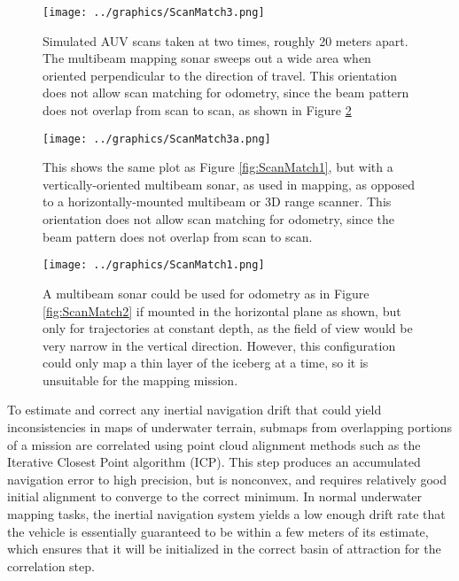 \begin{figure}[h]
   \centering
   \texttt{[image: ../graphics/ScanMatch3.png]} %
   \caption{Simulated AUV scans taken at two times, roughly 20 meters apart. The multibeam mapping sonar sweeps out a wide area when oriented perpendicular to the direction of travel. This orientation does not allow scan matching for odometry, since the beam pattern does not overlap from scan to scan, as shown in Figure \ref{fig:NoMatch}}
   \label{fig:beamOrientation}
\end{figure}

\begin{figure}[h]
   \centering
   \texttt{[image: ../graphics/ScanMatch3a.png]} %
   \caption{This shows the same plot as Figure \ref{fig:ScanMatch1}, but with a vertically-oriented multibeam sonar, as used in mapping, as opposed to a horizontally-mounted multibeam or 3D range scanner. This orientation does not allow scan matching for odometry, since the beam pattern does not overlap from scan to scan.}
   \label{fig:NoMatch}
\end{figure}

\begin{figure}[h]
   \centering
   \texttt{[image: ../graphics/ScanMatch1.png]} %
   \caption{A multibeam sonar could be used for odometry as in Figure \ref{fig:ScanMatch2} if mounted in the horizontal plane as shown, but only for trajectories at constant depth, as the field of view would be very narrow in the vertical direction. However, this configuration could only map a thin layer of the iceberg at a time, so it is unsuitable for the mapping mission.}
   \label{fig:ScanMatchMultibeam}
\end{figure}

To estimate and correct any inertial navigation drift that could yield inconsistencies in maps of underwater terrain, submaps from overlapping portions of a mission are correlated using point cloud alignment methods such as the Iterative Closest Point algorithm (ICP). This step produces an accumulated navigation error to high precision, but is nonconvex, and requires relatively good initial alignment to converge to the correct minimum. In normal underwater mapping tasks, the inertial navigation system yields a low enough drift rate that the vehicle is essentially guaranteed to be within a few meters of its estimate, which ensures that it will be initialized in the correct basin of attraction for the correlation step. 

